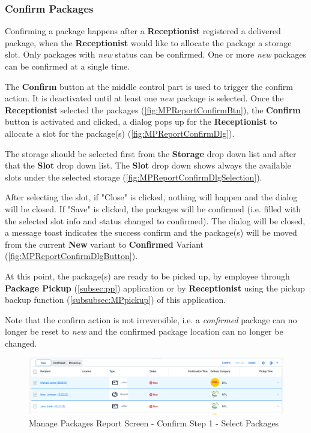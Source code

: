 \subsubsection{Confirm Packages}

Confirming a package happens after a \textbf{Receptionist} registered a delivered package, when the \textbf{Receptionist} would like to allocate the package a storage slot. Only packages with \textit{new} status can be confirmed. One or more \textit{new} packages can be confirmed at a single time.

The \textbf{Confirm} button at the middle control part is used to trigger the confirm action. It is deactivated until at least one \textit{new} package is selected.
Once the \textbf{Receptionist} selected the packages (\autoref{fig:MPReportConfirmBtn}), the \textbf{Confirm} button is activated and clicked, a dialog pops up for the \textbf{Receptionist} to allocate a slot for the package(s) (\autoref{fig:MPReportConfirmDlg}). 

The storage should be selected first from the \textbf{Storage} drop down list and after that the \textbf{Slot} drop down list. The \textbf{Slot} drop down shows always the available slots under the selected storage (\autoref{fig:MPReportConfirmDlgSelection}).

After selecting the slot, if "Close" is clicked, nothing will happen and the dialog will be closed. If "Save" is clicked, the packages will be confirmed (i.e. filled with the selected slot info and status changed to confirmed). The dialog will be closed, a message toast indicates the success confirm and the package(s) will be moved from the current \textbf{New} variant to \textbf{Confirmed} Variant (\autoref{fig:MPReportConfirmDlgButton}).

At this point, the package(s) are ready to be picked up, by employee through \textbf{Package Pickup} (\autoref{subsec:pp}) application or by \textbf{Receptionist} using the pickup backup function (\autoref{subsubsec:MPpickup}) of this application.

\bigskip
Note that the confirm action is not irreversible, i.e. a \textit{confirmed} package can no longer be reset to \textit{new} and the confirmed package location can no longer be changed.

\bigskip
\begin{figure}[H]
	\centering
	\includegraphics[width=1\linewidth]{images/user_doc/managePack/ReportScreen/browse/confirmActivated.png}
	\caption{Manage Packages Report Screen - Confirm Step 1 - Select Packages}
	\label{fig:MPReportConfirmBtn}
\end{figure}

